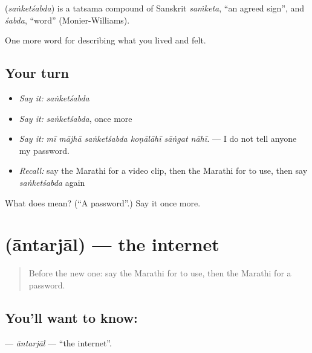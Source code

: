 \begin{cousinweb}
\textbf{} (\emph{saṅketśabda}) is a tatsama compound of Sanskrit \emph{saṁketa}, \textquotedblleft{}an agreed sign\textquotedblright{}, and \emph{śabda}, \textquotedblleft{}word\textquotedblright{} (Monier-Williams).
\end{cousinweb}

\begin{grammarlens}[title={What you've built}]
One more word for describing what you lived and felt.
\end{grammarlens}

\subsection*{Your turn}
\begin{itemize}
\raggedright
  \item \emph{Say it:} \emph{saṅketśabda}
  \item \emph{Say it:} \emph{saṅketśabda}, once more
  \item \emph{Say it:} \emph{mī mājhā saṅketśabda koṇālāhī sāṅgat nāhī.} — I do not tell anyone my password.
  \item \emph{Recall:} say the Marathi for a video clip, then the Marathi for to use, then say \emph{saṅketśabda} again
\end{itemize}

\begin{tcolorbox}[breakable,colback=teal!4,colframe=teal!35!black,title={Before you move on}]
What does  mean? (\textquotedblleft{}A password\textquotedblright{}.) Say it once more.
\end{tcolorbox}
\section[\texorpdfstring{\mr{आंतरजाल} (āntarjāl)}{आंतरजाल (āntarjāl)}]{ (āntarjāl) — the internet}

\label{lesson:MR-C517-antarjal}



\begin{quote}
Before the new one: say the Marathi for to use, then the Marathi for a password.
\end{quote}

\subsection*{You'll want to know: }
\textbf{} — \emph{āntarjāl} — \textquotedblleft{}the internet\textquotedblright{}.

